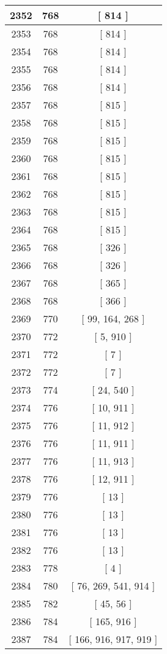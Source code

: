 \begin{center}
\begin{longtable}[H]{|| c c c ||}
\hline
2352 & 768 & [ 814 ] \\ 
\hline
2353 & 768 & [ 814 ] \\ 
\hline
2354 & 768 & [ 814 ] \\ 
\hline
2355 & 768 & [ 814 ] \\ 
\hline
2356 & 768 & [ 814 ] \\ 
\hline
2357 & 768 & [ 815 ] \\ 
\hline
2358 & 768 & [ 815 ] \\ 
\hline
2359 & 768 & [ 815 ] \\ 
\hline
2360 & 768 & [ 815 ] \\ 
\hline
2361 & 768 & [ 815 ] \\ 
\hline
2362 & 768 & [ 815 ] \\ 
\hline
2363 & 768 & [ 815 ] \\ 
\hline
2364 & 768 & [ 815 ] \\ 
\hline
2365 & 768 & [ 326 ] \\ 
\hline
2366 & 768 & [ 326 ] \\ 
\hline
2367 & 768 & [ 365 ] \\ 
\hline
2368 & 768 & [ 366 ] \\ 
\hline
2369 & 770 & [ 99, 164, 268 ] \\ 
\hline
2370 & 772 & [ 5, 910 ] \\ 
\hline
2371 & 772 & [ 7 ] \\ 
\hline
2372 & 772 & [ 7 ] \\ 
\hline
2373 & 774 & [ 24, 540 ] \\ 
\hline
2374 & 776 & [ 10, 911 ] \\ 
\hline
2375 & 776 & [ 11, 912 ] \\ 
\hline
2376 & 776 & [ 11, 911 ] \\ 
\hline
2377 & 776 & [ 11, 913 ] \\ 
\hline
2378 & 776 & [ 12, 911 ] \\ 
\hline
2379 & 776 & [ 13 ] \\ 
\hline
2380 & 776 & [ 13 ] \\ 
\hline
2381 & 776 & [ 13 ] \\ 
\hline
2382 & 776 & [ 13 ] \\ 
\hline
2383 & 778 & [ 4 ] \\ 
\hline
2384 & 780 & [ 76, 269, 541, 914 ] \\ 
\hline
2385 & 782 & [ 45, 56 ] \\ 
\hline
2386 & 784 & [ 165, 916 ] \\ 
\hline
2387 & 784 & [ 166, 916, 917, 919 ] \\ 

\end{longtable}
\end{center}
